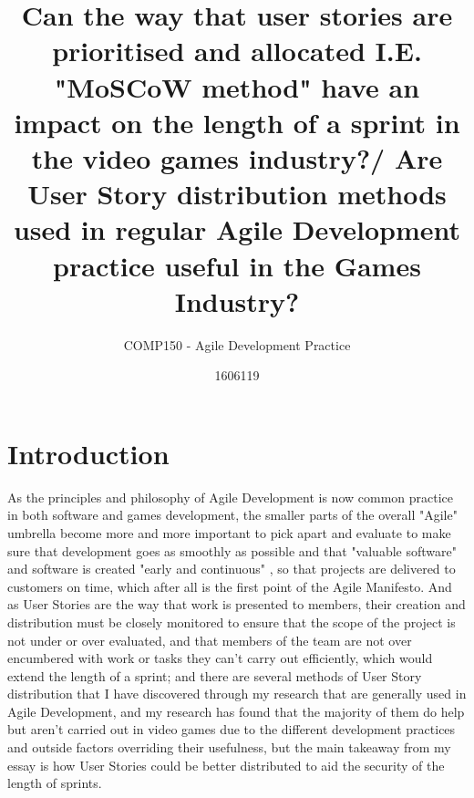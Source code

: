 \documentclass{scrartcl}
\title{Can the way that user stories are prioritised and allocated I.E. "MoSCoW method" have an impact on the length of a sprint in the video games industry?/ Are User Story distribution methods used in regular Agile Development practice useful in the Games Industry?}
\subtitle{COMP150 - Agile Development Practice}
\author{1606119}
\begin{document}
\maketitle


\section{Introduction}

As the principles and philosophy of Agile Development is now common practice in both software and games development, the smaller parts of the overall "Agile" umbrella become more and more important to pick apart and evaluate to make sure that development goes as smoothly as possible and that "valuable software" and software is created "early and continuous" \cite{agilemanifesto}, so that projects are delivered to customers on time, which after all is the first point of the Agile Manifesto. And as User Stories are the way that work is presented to members, their creation and distribution must be closely monitored to ensure that the scope of the project is not under or over evaluated, and that members of the team are not over encumbered with work or tasks they can't carry out efficiently, which would extend the length of a sprint; and there are several methods of User Story distribution that I have discovered through my research that are generally used in Agile Development, and my research has found that the majority of them do help but aren't carried out in video games due to the different development practices and outside factors overriding their usefulness, but the main takeaway from my essay is how User Stories could be better distributed to aid the security of the length of sprints.
\end{document}
